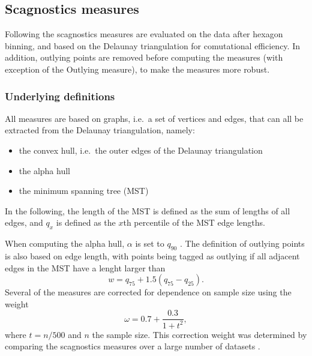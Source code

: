 \hypertarget{scagnostics-measures}{%
\subsection{Scagnostics measures}\label{scagnostics-measures}}

Following \citet{scag} the scagnostics measures are evaluated on the
data after hexagon binning, and based on the Delaunay triangulation for
comutational efficiency. In addition, outlying points are removed before
computing the measures (with exception of the Outlying measure), to make
the measures more robust.

\hypertarget{underlying-definitions}{%
\subsubsection{Underlying definitions}\label{underlying-definitions}}

All measures are based on graphs, i.e.~a set of vertices and edges, that
can all be extracted from the Delaunay triangulation, namely:

\begin{itemize}
\tightlist
\item
  the convex hull, i.e.~the outer edges of the Delaunay triangulation
\item
  the alpha hull \citep{1056714}
\item
  the minimum spanning tree (MST) \citep{kruskal1956}
\end{itemize}

In the following, the length of the MST is defined as the sum of lengths
of all edges, and \(q_x\) is defined as the \(x\)th percentile of the
MST edge lengths.

When computing the alpha hull, \(\alpha\) is set to \(q_{90}\)
\citep{scag}. The definition of outlying points is also based on edge
length, with points being tagged as outlying if all adjacent edges in
the MST have a lenght larger than \begin{equation}
w = q_{75} + 1.5 ( q_{75} - q_{25}).
\label{eq:w}
\end{equation} Several of the measures are corrected for dependence on
sample size using the weight \begin{equation}
\omega = 0.7 + \frac{0.3}{1+t^2},
\end{equation} where \(t = n / 500\) and \(n\) the sample size. This
correction weight was determined by comparing the scagnostics measures
over a large number of datasets \citep{scag}.

